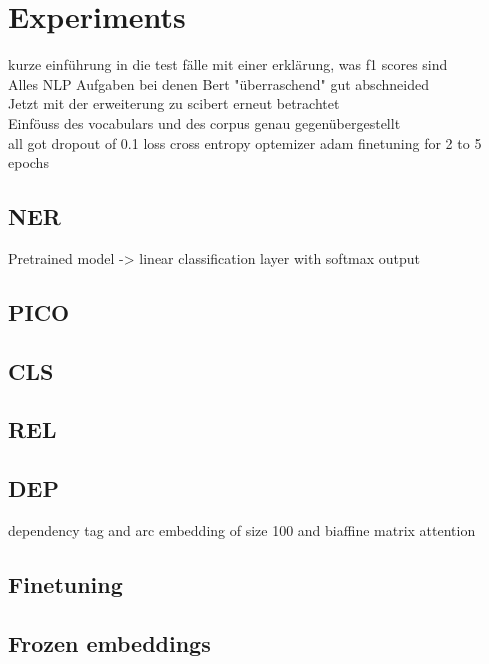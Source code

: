\chapter{Experiments}
kurze einführung in die test fälle mit einer erklärung, was f1 scores sind\\
Alles NLP Aufgaben bei denen Bert "überraschend" gut abschneided\\
Jetzt mit der erweiterung zu scibert erneut betrachtet\\
Einföuss des vocabulars und des corpus genau gegenübergestellt\\

all got dropout of 0.1
loss cross entropy
optemizer adam
finetuning for 2 to 5 epochs 
\section{NER}
Pretrained model -> linear classification layer with softmax output
\section{PICO}
\section{CLS}
\section{REL}
\section{DEP}
dependency  tag and arc embedding of size 100 and biaffine matrix attention 
\section{Finetuning}
\section{Frozen embeddings}
